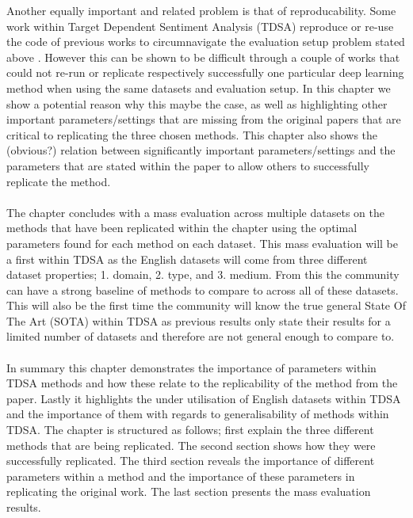 Another equally important and related problem is that of reproducability. Some work within Target Dependent Sentiment Analysis (TDSA) reproduce or re-use the code of previous works to circumnavigate the evaluation setup problem stated above \citep{chen-etal-2017-recurrent,tay2018learning}. However this can be shown to be difficult through a couple of works \citep{chen-etal-2017-recurrent,tay2018learning} that could not re-run or replicate respectively successfully one particular deep learning method \citet{tang-etal-2016-effective} when using the same datasets and evaluation setup. In this chapter we show a potential reason why this maybe the case, as well as highlighting other important parameters/settings that are missing from the original papers that are critical to replicating the three chosen methods. This chapter also shows the (obvious?) relation between significantly important parameters/settings and the parameters that are stated within the paper to allow others to successfully replicate the method.\\
\\
The chapter concludes with a mass evaluation across multiple datasets on the methods that have been replicated within the chapter using the optimal parameters found for each method on each dataset. This mass evaluation will be a first within TDSA as the English datasets will come from three different dataset properties; 1. domain, 2. type, and 3. medium. From this the community can have a strong baseline of methods to compare to across all of these datasets. This will also be the first time the community will know the true general State Of The Art (SOTA) within TDSA as previous results only state their results for a limited number of datasets and therefore are not general enough to compare to.\\
\\
In summary this chapter demonstrates the importance of parameters within TDSA methods and how these relate to the replicability of the method from the paper. Lastly it highlights the under utilisation of English datasets within TDSA and the importance of them with regards to generalisability of methods within TDSA. The chapter is structured as follows; first explain the three different methods that are being replicated. The second section shows how they were successfully replicated. The third section reveals the importance of different parameters within a method and the importance of these parameters in replicating the original work. The last section presents the mass evaluation results.

